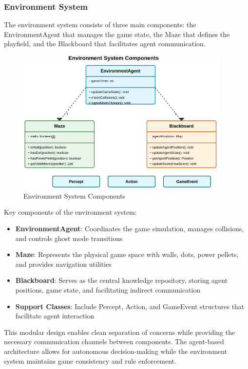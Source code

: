 \documentclass[a4paper, 11pt]{article}
\begin{document}
\subsubsection{Environment System}
The environment system consists of three main components: the EnvironmentAgent that manages the game state, the Maze that defines the playfield, and the Blackboard that facilitates agent communication.

\begin{figure}[h]
\centering
\includegraphics[width=0.95\textwidth]{environment-class-diagram.png}
\caption{Environment System Components}
\end{figure}

Key components of the environment system:
\begin{itemize}
    \item \textbf{EnvironmentAgent}: Coordinates the game simulation, manages collisions, and controls ghost mode transitions
    \item \textbf{Maze}: Represents the physical game space with walls, dots, power pellets, and provides navigation utilities
    \item \textbf{Blackboard}: Serves as the central knowledge repository, storing agent positions, game state, and facilitating indirect communication
    \item \textbf{Support Classes}: Include Percept, Action, and GameEvent structures that facilitate agent interaction
\end{itemize}

This modular design enables clean separation of concerns while providing the necessary communication channels between components. The agent-based architecture allows for autonomous decision-making while the environment system maintains game consistency and rule enforcement.
\end{document}
